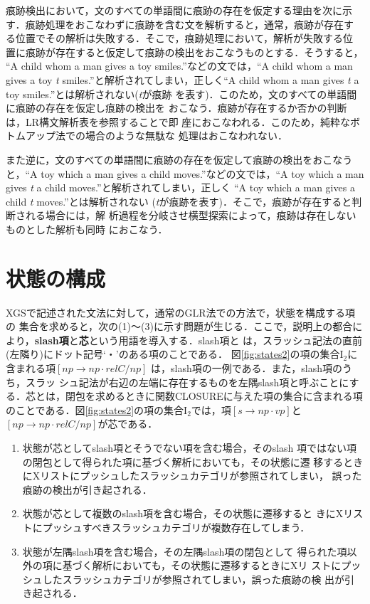 \vspace{-3mm}
痕跡検出において，文のすべての単語間に痕跡の存在を仮定する理由を次に示
す．痕跡処理をおこなわずに痕跡を含む文を解析すると，通常，痕跡が存在す
る位置でその解析は失敗する．そこで，痕跡処理において，解析が失敗する位
置に痕跡が存在すると仮定して痕跡の検出をおこなうものとする．そうすると，
``A child whom a man gives a toy smiles.''などの文では，``A child whom
a man gives a toy {\it t} smiles.''と解析されてしまい，正しく``A child
whom a man gives {\it t} a toy smiles.''とは解析されない({\it t}が痕跡
を表す)．このため，文のすべての単語間に痕跡の存在を仮定し痕跡の検出を
おこなう．痕跡が存在するか否かの判断は，LR構文解析表を参照することで即
座におこなわれる．このため，純粋なボトムアップ法での場合のような無駄な
処理はおこなわれない．

また逆に，文のすべての単語間に痕跡の存在を仮定して痕跡の検出をおこなう
と，``A toy which a man gives a child moves.''などの文では，``A toy
which a man gives {\it t} a child moves.''と解析されてしまい，正しく
``A toy which a man gives a child {\it t} moves.''とは解析されない
({\it t}が痕跡を表す)．そこで，痕跡が存在すると判断される場合には，解
析過程を分岐させ横型探索によって，痕跡は存在しないものとした解析も同時
におこなう．

\section{状態の構成}

XGSで記述された文法に対して，通常のGLR法での方法で，状態を構成する項の
集合を求めると，次の(1)〜(3)に示す問題が生じる．ここで，説明上の都合に
より，{\bf slash項}と{\bf 芯}という用語を導入する．slash項と
は，スラッシュ記法の直前(左隣り)にドット記号`・'のある項のことである．
図\ref{fig:states2}の項の集合I$_{2}$に含まれる項$[np \to np \cdot
relC/np]$ は，slash項の一例である．また，slash項のうち，スラッ
シュ記法が右辺の左端に存在するものを左隅slash項と呼ぶことにす
る．芯とは，閉包を求めるときに関数CLOSUREに与えた項の集合に含まれる項
のことである．図\ref{fig:states2}の項の集合I$_{2}$では，項$[s \to np
\cdot vp]$と$[np \to np \cdot relC/np]$が芯である．

\begin{enumerate}
\item 状態が芯としてslash項とそうでない項を含む場合，そのslash
  項ではない項の閉包として得られた項に基づく解析においても，その状態に遷
  移するときにXリストにプッシュしたスラッシュカテゴリが参照されてしまい，
  誤った痕跡の検出が引き起される．
\item 状態が芯として複数のslash項を含む場合，その状態に遷移すると
  きにXリストにプッシュすべきスラッシュカテゴリが複数存在してしまう．
\item 状態が左隅slash項を含む場合，その左隅slash項の閉包として
  得られた項以外の項に基づく解析においても，その状態に遷移するときにXリ
  ストにプッシュしたスラッシュカテゴリが参照されてしまい，誤った痕跡の検
  出が引き起される．
\end{enumerate}

